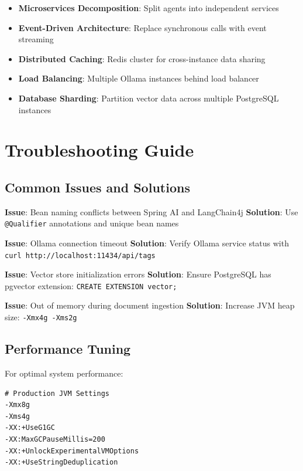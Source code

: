 \documentclass[12pt,a4paper]{article}
\begin{document}
\begin{itemize}
    \item \textbf{Microservices Decomposition}: Split agents into independent services
    \item \textbf{Event-Driven Architecture}: Replace synchronous calls with event streaming
    \item \textbf{Distributed Caching}: Redis cluster for cross-instance data sharing
    \item \textbf{Load Balancing}: Multiple Ollama instances behind load balancer
    \item \textbf{Database Sharding}: Partition vector data across multiple PostgreSQL instances
\end{itemize}

\section{Troubleshooting Guide}

\subsection{Common Issues and Solutions}

\begin{tcolorbox}[colback=yellow!5!white,colframe=yellow!75!black,title=Troubleshooting Checklist]
\textbf{Issue}: Bean naming conflicts between Spring AI and LangChain4j
\textbf{Solution}: Use \texttt{@Qualifier} annotations and unique bean names

\textbf{Issue}: Ollama connection timeout
\textbf{Solution}: Verify Ollama service status with \texttt{curl http://localhost:11434/api/tags}

\textbf{Issue}: Vector store initialization errors  
\textbf{Solution}: Ensure PostgreSQL has pgvector extension: \texttt{CREATE EXTENSION vector;}

\textbf{Issue}: Out of memory during document ingestion
\textbf{Solution}: Increase JVM heap size: \texttt{-Xmx4g -Xms2g}
\end{tcolorbox}

\subsection{Performance Tuning}

For optimal system performance:

\begin{lstlisting}[caption=JVM Optimization Parameters]
# Production JVM Settings
-Xmx8g
-Xms4g  
-XX:+UseG1GC
-XX:MaxGCPauseMillis=200
-XX:+UnlockExperimentalVMOptions
-XX:+UseStringDeduplication
\end{lstlisting}
\end{document}
